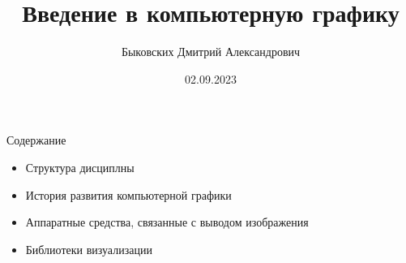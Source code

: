 \documentclass{beamer}
\title[Введение в КГ]{Введение в компьютерную графику}
\author[Быковских Д.А.]{Быковских Дмитрий Александрович}
\date{02.09.2023}
\begin{document}
	\begin{frame}
		\titlepage
	\end{frame}
	\begin{frame}{Содержание}
		\begin{itemize}
			\item 
			Структура дисциплны
			\item
			История развития компьютерной графики
			\item
			Аппаратные средства, связанные с выводом изображения
			\item 
			Библиотеки визуализации
		\end{itemize}
	\end{frame}
\end{document}
